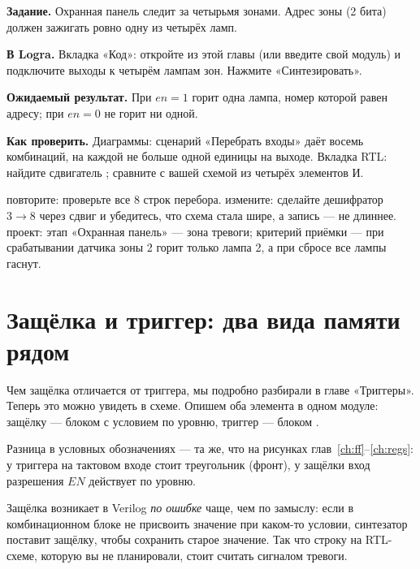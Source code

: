 
\begin{diybox}
\textbf{Задание.} Охранная панель следит за четырьмя зонами. Адрес зоны  (2 бита) должен зажигать ровно одну из четырёх ламп.

\textbf{В Logra.} Вкладка «Код»: откройте  из этой главы (или введите свой модуль) и подключите выходы к четырём лампам зон. Нажмите «Синтезировать».

\textbf{Ожидаемый результат.} При $en=1$ горит одна лампа, номер которой равен адресу; при $en=0$ не горит ни одной.

\textbf{Как проверить.} Диаграммы: сценарий «Перебрать входы» даёт восемь комбинаций, на каждой не больше одной единицы на выходе. Вкладка RTL: найдите сдвигатель \code{<<}; сравните с вашей схемой из четырёх элементов И.

 повторите: проверьте все 8 строк перебора.  измените: сделайте дешифратор $3\to 8$ через сдвиг  и убедитесь, что схема стала шире, а запись --- не длиннее.  проект: этап «Охранная панель» --- зона тревоги; критерий приёмки --- при срабатывании датчика зоны 2 горит только лампа 2, а при сбросе все лампы гаснут.
\end{diybox}

\section{Защёлка и триггер: два вида памяти рядом}

Чем защёлка отличается от триггера, мы подробно разбирали в главе
«Триггеры». Теперь это можно увидеть в схеме. Опишем оба элемента в одном
модуле: защёлку --- блоком  с условием по уровню, триггер ---
блоком .



Разница в условных обозначениях --- та же, что на рисунках глав~\ref{ch:ff}--\ref{ch:regs}:
у триггера на тактовом входе стоит треугольник (фронт), у защёлки вход
разрешения $EN$ действует по уровню.

\begin{warnbox}
Защёлка возникает в Verilog \emph{по ошибке} чаще, чем по замыслу: если в
комбинационном блоке не присвоить значение при каком-то условии, синтезатор
поставит защёлку, чтобы сохранить старое значение. Так что строку
 на RTL-схеме, которую вы не планировали, стоит считать
сигналом тревоги.
\end{warnbox}


